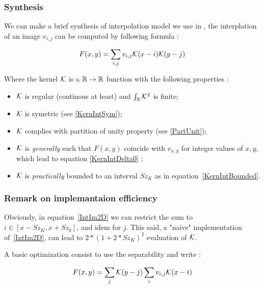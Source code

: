 \subsubsection{Synthesis}

We can make a brief synthesis of interpolation model we use in \PPP,  the interplation of an image $v_{i,j}$ can
be computed by following formula :

\begin{equation}
    F(x,y) =  \sum_{i,j}  v_{i,j}  \mathcal K(x-i) \mathcal K(y-j)   \label{IntIm2D}
\end{equation}


Where the kernel  $\mathcal K$ is a  $\mathbb{R} \rightarrow \mathbb{R}$ function with the following properties :

\begin{itemize}
    \item  $\mathcal K$ is regular (continous at least) and $\int_{\mathbb{R}} \mathcal K^2$ is finite;
    \item  $\mathcal K$ is symetric (see \ref{KernIntSym});
    \item  $\mathcal K$ complies with partition of unity property (see \ref{PartUnit});
    \item  $\mathcal K$ is \emph{generally} such that $F(x,y)$ coincide with $v_{x,y}$ for integer
           values of $x,y$, which lead to  equation \ref{KernIntDelta0} ;
    \item  $\mathcal K$ is \emph{practically} bounded to an interval $Sz_K$ as in equation~\ref{KernIntBounded}.
\end{itemize}

\subsubsection{Remark on implemantaion efficiency}

\label{InterpValueEff}

Obviously, in equation~\ref{IntIm2D} we can  restrict the sum to $i \in [x-Sz_K,x+Sz_k]$, and
idem for $j$. This said, a "naive" implementation of~\ref{IntIm2D}, can lead
to $2*(1+2*Sz_K)^2$ evaluation of $\mathcal K$. 

A basic optimization consist to use the separability and write :

\begin{equation}
    F(x,y) =  \sum_{j}  \mathcal K(y-j)   \sum_{i}  v_{i,j}  \mathcal K(x-i)  \label{IntIm2DOpt}
\end{equation}

